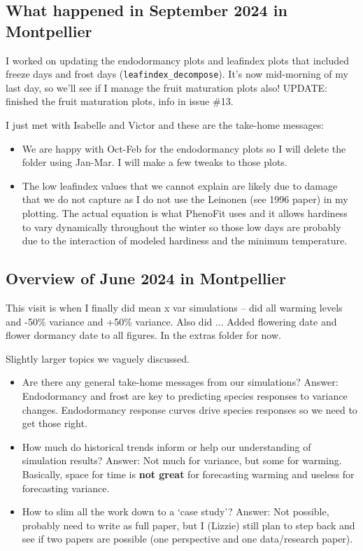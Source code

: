 \documentclass[11pt,letter]{article}
\begin{document}
\subsection{What happened in September 2024 in Montpellier}

I worked on updating the endodormancy plots and leafindex plots that included freeze days and frost days (\verb|leafindex_decompose|). It's now mid-morning of my last day, so we'll see if I manage the fruit maturation plots also! UPDATE: finished the fruit maturation plots, info in issue \#13. 

I just met with Isabelle and Victor and these are the take-home messages:
\begin{itemize}
\item We are happy with Oct-Feb for the endodormancy plots  so I will delete the folder using Jan-Mar. I will make a few tweaks to those plots. 
\item The low leafindex values that we cannot explain are likely due to damage that we do not capture as I do not use the Leinonen (see 1996 paper) in my plotting. The actual equation is what PhenoFit uses and it allows hardiness to vary dynamically throughout the winter so those low days are probably due to the interaction of modeled hardiness and the minimum temperature.
\end{itemize}

\subsection{Overview of June 2024 in Montpellier}
This visit is when I finally did mean x var simulations -- did all warming levels and -50\% variance and +50\% variance. 
Also did ... Added flowering date and flower dormancy date to all figures. In the extras folder for now. 

Slightly larger topics we vaguely discussed. 
\begin{itemize}
\item Are there any general take-home messages from our simulations? Answer: Endodormancy and frost are key to predicting species responses to variance changes. Endodormancy response curves drive species responses so we need to get those right. 
\item How much do historical trends inform or help our understanding of simulation results?  Answer: Not much for variance, but some for warming. Basically, space for time is {\bf not great} for forecasting warming and useless for forecasting variance. 
\item How to slim all the work down to a `case study'?  Answer: Not possible, probably need to write as full paper, but I (Lizzie) still plan to step back and see if two papers are possible (one perspective and one data/research paper). 
\end{itemize}
\end{document}
